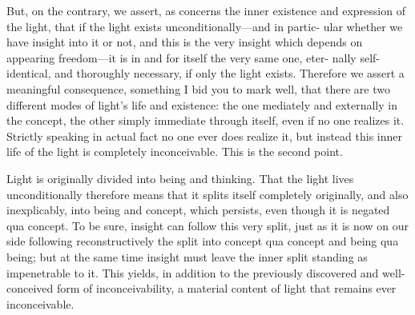But, on the contrary, we assert, as concerns the inner existence and
expression of the light, that if the light exists unconditionally—and in partic-
ular whether we have insight into it or not, and this is the very insight which
depends on appearing freedom—it is in and for itself the very same one, eter-
nally self-identical, and thoroughly necessary, if only the light exists.
Therefore we assert a meaningful consequence,
something I bid you to mark well,
that there are two different modes of light’s life and existence:
the one mediately and externally in the concept,
the other simply immediate through itself,
even if no one realizes it.
Strictly speaking in actual fact no one ever does realize it,
but instead this inner life of the light is completely inconceivable.
This is the second point.

Light is originally divided into being and thinking.
 That the light lives
unconditionally therefore means that it splits itself completely originally, and
also inexplicably, into being and concept, which persists, even though it is
negated qua concept.
 To be sure, insight can follow this very split, just as it is
now on our side following reconstructively the split into concept qua
concept and being qua being; but at the same time insight must leave the inner
split standing as impenetrable to it.
 This yields, in addition to the previously
discovered and well-conceived form of inconceivability, a material content of
light that remains ever inconceivable.

